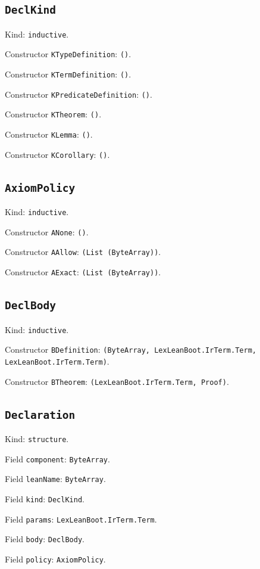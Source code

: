 \documentclass[11pt]{article}
\begin{document}
\subsection*{\texttt{DeclKind}}
\noindent Kind: \texttt{inductive}.\par
\noindent Constructor \texttt{KTypeDefinition}: \texttt{()}.\par
\noindent Constructor \texttt{KTermDefinition}: \texttt{()}.\par
\noindent Constructor \texttt{KPredicateDefinition}: \texttt{()}.\par
\noindent Constructor \texttt{KTheorem}: \texttt{()}.\par
\noindent Constructor \texttt{KLemma}: \texttt{()}.\par
\noindent Constructor \texttt{KCorollary}: \texttt{()}.\par
\subsection*{\texttt{AxiomPolicy}}
\noindent Kind: \texttt{inductive}.\par
\noindent Constructor \texttt{ANone}: \texttt{()}.\par
\noindent Constructor \texttt{AAllow}: \texttt{(List (ByteArray))}.\par
\noindent Constructor \texttt{AExact}: \texttt{(List (ByteArray))}.\par
\subsection*{\texttt{DeclBody}}
\noindent Kind: \texttt{inductive}.\par
\noindent Constructor \texttt{BDefinition}: \texttt{(ByteArray, LexLeanBoot.IrTerm.Term, LexLeanBoot.IrTerm.Term)}.\par
\noindent Constructor \texttt{BTheorem}: \texttt{(LexLeanBoot.IrTerm.Term, Proof)}.\par
\subsection*{\texttt{Declaration}}
\noindent Kind: \texttt{structure}.\par
\noindent Field \texttt{component}: \texttt{ByteArray}.\par
\noindent Field \texttt{leanName}: \texttt{ByteArray}.\par
\noindent Field \texttt{kind}: \texttt{DeclKind}.\par
\noindent Field \texttt{params}: \texttt{LexLeanBoot.IrTerm.Term}.\par
\noindent Field \texttt{body}: \texttt{DeclBody}.\par
\noindent Field \texttt{policy}: \texttt{AxiomPolicy}.\par
\end{document}
